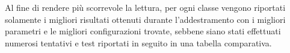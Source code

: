 Al fine di rendere più scorrevole la lettura, per ogni classe vengono riportati solamente i migliori risultati ottenuti durante l'addestramento con i migliori parametri e le migliori configurazioni trovate, sebbene
siano stati effettuati numerosi tentativi e test riportati in seguito in una tabella comparativa.\\






